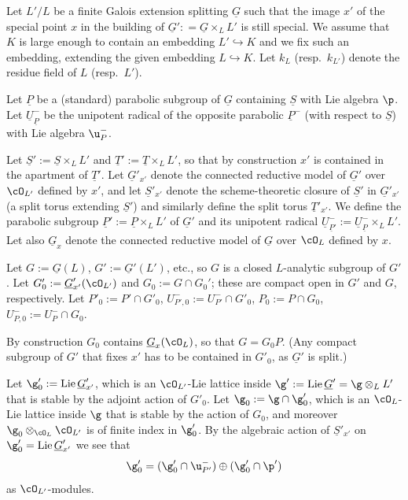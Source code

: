 \documentclass[a4paper]{amsart}
\numberwithin{equation}{section}
\theoremstyle{remark}
\theoremstyle{definition}
\DeclareMathOperator{\Lie}{Lie}
\newcommand{\alggrp}[1]{\underline{#1}}
\newcommand{\into}{\hookrightarrow}
\begin{document}
Let $L'/L$ be a finite Galois extension splitting $\alggrp G$ such that the image $x'$ of the special point $x$ 
in the building of $\alggrp G' : = \alggrp G \times_{L} L'$ is still special.
We assume that $K$ is large enough to contain an embedding $L' \into K$ and we fix such an embedding, extending the given embedding $L \into K$.
Let $k_L$ (resp.\ $k_{L'}$) denote the residue field of $L$ (resp.\ $L'$).


Let $\alggrp P$ be a (standard) parabolic subgroup of $\alggrp G$ containing $\alggrp S$ with Lie algebra $\p$.
Let $\alggrp U_{\alggrp P}^-$ be the unipotent radical of the opposite parabolic $\alggrp P^{-}$ (with respect to $\alggrp S$) with Lie algebra $\u_P^-$.

Let $\alggrp S' := \alggrp S \times_{L} {L'}$ and $\alggrp T' := \alggrp T \times_{L} {L'}$, so that by construction $x'$ is contained in the apartment of $\alggrp T'$.
Let $\alggrp G'_{x'}$ denote the connected reductive model of $\alggrp G'$ over $\cO_{L'}$ defined by $x'$, and
let $\alggrp S'_{x'}$ denote the scheme-theoretic closure of $\alggrp S'$ in $\alggrp G'_{x'}$ (a split torus extending $\alggrp S'$)
and similarly define the split torus $\alggrp T'_{x'}$.
We define the parabolic subgroup $\alggrp P' := \alggrp P \times_L L'$ of $\alggrp{G}'$ and its unipotent radical $\alggrp {U}^-_{\alggrp P'} := \alggrp U_{\alggrp P}^- \times_L L'$.
Let also $\alggrp G_x$ denote the connected reductive model of $\alggrp G$ over $\cO_{L}$ defined by $x$.


Let $G := \alggrp G(L)$, $G' := \alggrp G'(L')$, etc., so $G$ is a closed $L$-analytic subgroup of $G'$.
Let $G'_0 := \alggrp G'_{x'}(\cO_{L'})$ and $G_0 := G \cap G_0'$; these are compact open in $G'$ and $G$, respectively.
Let $P'_0 := P' \cap G'_0$, $U^-_{P',0} := U^-_{P'} \cap G'_0$, $P_0 := P \cap G_0$, $U_{P,0}^- := U_P^- \cap G_0$.

By construction $G_0$ contains $\alggrp G_x(\cO_L)$, so that $G = G_0 P$. (Any compact subgroup of $G'$ that fixes
$x'$ has to be contained in $G'_0$, as $\alggrp G'$ is split.)

Let $\g'_0 := \Lie \alggrp G'_{x'}$, which is an $\cO_{L'}$-Lie lattice inside $\g' := \Lie \alggrp G' = \g \otimes_L L'$ that is stable by the adjoint action of $G'_0$.
Let $\g_0 := \g \cap \g'_0$, which is an $\cO_{L}$-Lie lattice inside $\g$ that is stable by the action of $G_0$,
and moreover $\g_0 \otimes_{\cO_L} \cO_{L'}$ is of finite index in $\g'_0$.
By the algebraic action of $\alggrp S'_{x'}$ on $\g'_0=\Lie \alggrp G'_{x'}$ we see that
\begin{equation}\label{eq:g0'-decomp}
  \g'_0 = (\g'_0 \cap \u_{P'}^-) \oplus (\g'_0 \cap \p')
\end{equation}
as $\cO_{L'}$-modules.
\end{document}
